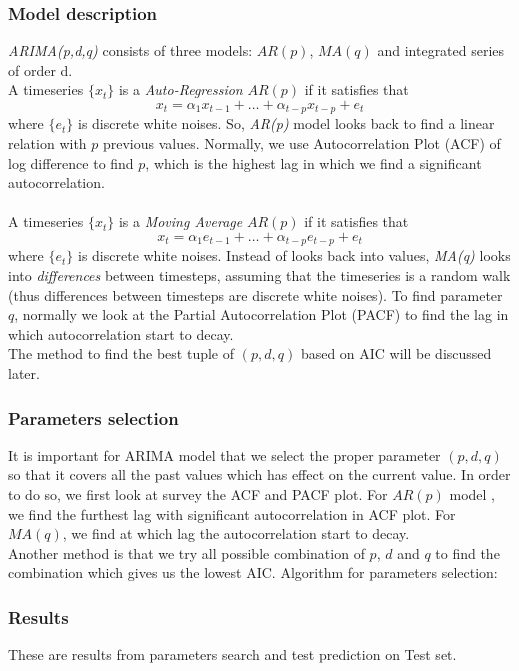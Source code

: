 \documentclass[11pt]{article}
\begin{document}
\subsubsection{Model description}
\textit{ARIMA(p,d,q)} consists of three models: $AR(p)$, $MA(q)$ and integrated
series of order d.\\ 
A timeseries $\{x_t\}$ is a \textit{Auto-Regression} $AR(p)$ if it satisfies that
$$
x_t = \alpha_1x_{t-1} + \ldots + \alpha_{t-p}x_{t-p} + e_t 
$$
where $\{e_t\}$ is discrete white noises. So, \textit{AR(p)} model looks back to
find a linear relation with $p$ previous values. Normally, we use
Autocorrelation Plot (ACF) of log difference to find $p$, which is the highest
lag in which we find a significant autocorrelation.\\
\\
A timeseries $\{x_t\}$ is a \textit{Moving Average} $AR(p)$ if it satisfies that
$$
x_t = \alpha_1e_{t-1} + \ldots + \alpha_{t-p}e_{t-p} + e_t 
$$
where $\{e_t\}$ is discrete white noises. Instead of looks back into values,
\textit{MA(q)} looks into \textit{differences} between timesteps, assuming that
the timeseries is a random walk (thus differences between timesteps are discrete
white noises). To find parameter $q$, normally we look at the Partial
Autocorrelation Plot (PACF) to find the lag in which autocorrelation start to
decay.\\ The method to find the best tuple of $(p,d,q)$ based on AIC will
be discussed later.\\


\subsubsection{Parameters selection}
It is important for ARIMA model that we select the proper parameter
$(p, d, q)$ so that it covers all the past values which has effect on the
current value. In order to do so, we first look at survey the ACF and PACF plot.
For ${AR}(p)$ model , we find the furthest lag with significant autocorrelation
in ACF plot. For
$MA(q)$, we find at which lag the autocorrelation start to decay.\\
Another method is that we try all possible combination of $p$, $d$ and $q$ to
find the combination which gives us the lowest AIC.
Algorithm for parameters selection:


\subsubsection{Results}
These are results from parameters search and test prediction on Test set.
\end{document}
